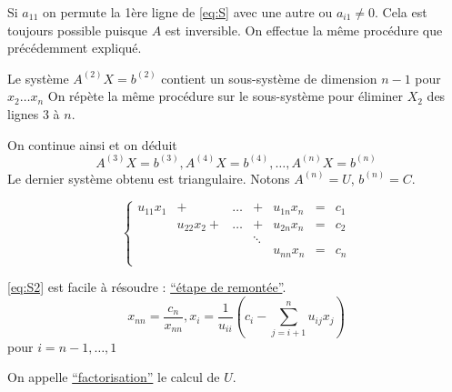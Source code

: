 \documentclass[a4paper,11pt]{article}
\theoremstyle{plain} %
\begin{document}
Si $a_{11}$ on permute la 1ère ligne de \ref{eq:S} avec une autre ou $a_{i1} \neq 0$. Cela est toujours possible puisque $A$ est inversible.
On effectue la même procédure que précédemment expliqué.

Le système $A^{(2)} X = b^{(2)}$ contient un sous-système de dimension $n-1$ pour $x_2\dots x_n$
On répète la même procédure sur le sous-système pour éliminer $X_2$ des lignes 3 à $n$.

On continue ainsi et on déduit
\[
    A^{(3)}X = b^{(3)}, A^{(4)}X = b^{(4)}, \dots, A^{(n)}X=b^{(n)}
\]
Le dernier système obtenu est triangulaire. Notons $A^{(n)}=U$, $b^{(n)}=C$.

\begin{equation}
    \left\lbrace
    \begin{array}{ccccccc}
        u_{11}x_1 & + & \dots & + & u_{1n}x_n & = & c_1 \\
                  & u_{22}x_2 + & \dots & + & u_{2n}x_n & = & c_2 \\
        & & & \ddots \\
        & & & & u_{nn}x_n & = & c_n \\
    \end{array}\right.
    \tag{S'}
    \label{eq:S2}
\end{equation}

\ref{eq:S2} est facile à résoudre : \underline{``étape de remontée''}.
\[
    x_{nn} = \frac{c_n}{x_{nn}}, x_i = \frac{1}{u_{ii}}(c_i - \sum_{j=i+1}^{n}u_{ij}x_j )
\] pour $i = n-1, \dots, 1$

\begin{remark}
    On appelle \underline{``factorisation''} le calcul de $U$.
\end{remark}
\end{document}
